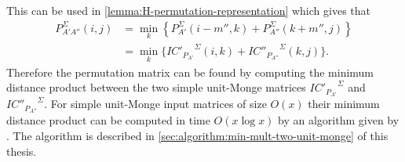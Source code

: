 \documentclass[twoside,11pt,openright]{report}
\begin{document}
This can be used in \cref{lemma:H-permutation-representation} which gives that
\begin{align*}
  P_{A'A''}^{\Sigma}(i, j) &= \min_k \left\{ P_{A'}^{\Sigma}(i - m'', k) + P_{A''}^{\Sigma}(k + m'', j) \right\} \\
                           &= \min_k \{ {IC'_{P_{A'}}}^{\Sigma}(i, k) + {IC''_{P_{A''}}}^{\Sigma}(k, j) \}.
\end{align*}
Therefore the permutation matrix can be found by computing the minimum distance product between the two simple unit-Monge matrices ${IC'_{P_{A'}}}^{\Sigma}$ and ${IC''_{P_{A''}}}^{\Sigma}$. For simple unit-Monge input matrices of size $O(x)$ their minimum distance product can be computed in time $O(x \log{x})$ by an algorithm given by \cite{Tiskin:2010:FDM:1873601.1873704}. The algorithm is described in \cref{sec:algorithm:min-mult-two-unit-monge} of this thesis.
\end{document}
